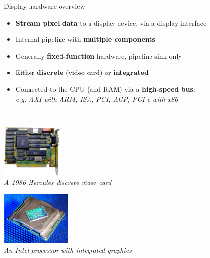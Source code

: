 \begin{frame}{Display hardware overview}
  \begin{itemize}
  \item \textbf{Stream pixel data} to a display device, via a display interface
  \item Internal pipeline with \textbf{multiple components}
  \item Generally \textbf{fixed-function} hardware, pipeline sink only
  \item Either \textbf{discrete} (video card) or \textbf{integrated}
  \item Connected to the CPU (and RAM) via a \textbf{high-speed bus}:\\
  \textit{e.g. AXI with ARM, ISA, PCI, AGP, PCI-e with x86}
  \end{itemize}~

  \begin{minipage}[t]{0.45\textwidth}
    \centering
    \includegraphics[height=7em]{slides/graphics-hardware/ati-hercules-1986.png}\\
    \textit{\small A 1986 Hercules discrete video card}
  \end{minipage}
  \hfill
  \begin{minipage}[t]{0.45\textwidth}
    \centering
    \includegraphics[height=7em]{slides/graphics-hardware/intel-skylake.jpg}\\
    \textit{\small An Intel processor with integrated graphics}
  \end{minipage}
\end{frame}


